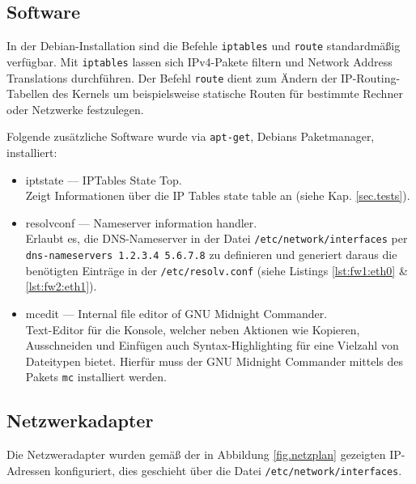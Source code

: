 \subsection{Software}\label{sec.software}

In der Debian-Installation sind die Befehle {\tt iptables} und {\tt route}
standardmäßig verfügbar.
Mit {\tt iptables} lassen sich IPv4-Pakete filtern und Network Address
Translations durchführen.
Der Befehl {\tt route} dient zum Ändern der IP-Routing-Tabellen des Kernels um
beispielsweise statische Routen für bestimmte Rechner oder Netzwerke
festzulegen.

Folgende zusätzliche Software wurde via {\tt apt-get}, Debians Paketmanager,
installiert:

\begin{itemize}
    \item iptstate --- IPTables State Top.\\
        Zeigt Informationen über die IP Tables state table an (siehe Kap.
        \ref{sec.tests}).
    \item resolvconf --- Nameserver information handler.\\
        Erlaubt es, die DNS-Nameserver in der Datei
        {\tt /etc/network/interfaces}
        per {\tt dns-nameservers 1.2.3.4 5.6.7.8} zu definieren und
        generiert daraus die benötigten Einträge in der {\tt /etc/resolv.conf}
        (siehe Listings \ref{lst:fw1:eth0} \& \ref{lst:fw2:eth1}).
    \item mcedit --- Internal file editor of GNU Midnight Commander.\\
        Text-Editor für die Konsole, welcher neben Aktionen wie Kopieren,
        Ausschneiden und Einfügen auch Syntax-Highlighting für eine Vielzahl von
        Dateitypen bietet. Hierfür muss der GNU Midnight Commander mittels des
        Pakets {\tt mc} installiert werden.
\end{itemize}


\subsection{Netzwerkadapter}\label{sec.netzwerk}

Die Netzweradapter wurden gemäß der in Abbildung \ref{fig.netzplan}
gezeigten IP-Adressen konfiguriert, dies geschieht über die Datei
{\tt /etc/network/interfaces}.

\subsubsection{\fwa}

